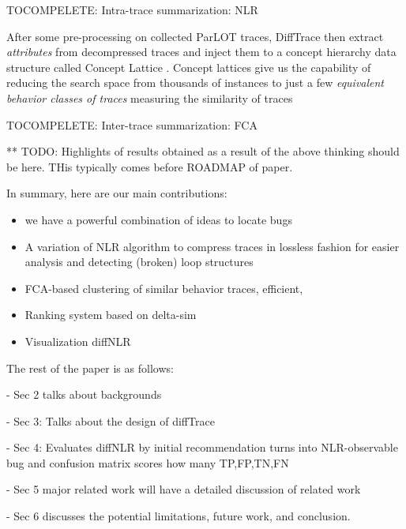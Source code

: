 %

TOCOMPELETE: Intra-trace summarization: NLR

%

After some pre-processing on collected ParLOT traces, DiffTrace then extract \textit{attributes} from decompressed traces and inject them to a concept hierarchy data structure called Concept Lattice \cite{clbook}.
%
Concept lattices give us the capability of reducing the search space from thousands of instances to just a few \textit{equivalent behavior classes of traces} measuring the similarity of traces\cite{Alqadah2011}

TOCOMPELETE: Inter-trace summarization: FCA

%
 



**   TODO: Highlights of results obtained as a result of the above thinking should be here. THis typically comes before ROADMAP of paper.

In summary, here are our main contributions:
\begin{itemize}
\item we have a powerful combination of ideas to locate bugs
\item A variation of NLR algorithm to compress traces in lossless fashion for easier analysis and detecting (broken) loop structures 
\item FCA-based clustering of similar behavior traces, efficient, 
\item Ranking system based on delta-sim
\item Visualization diffNLR
\end{itemize}

%

The rest of the paper is as follows:

- Sec 2 talks about backgrounds 

- Sec 3: Talks about the design of diffTrace

- Sec 4: Evaluates diffNLR by initial recommendation turns into NLR-observable bug and confusion matrix scores how many TP,FP,TN,FN

- Sec 5 major related work will have a detailed discussion of related work

- Sec 6 discusses the potential limitations, future work,  and conclusion.


